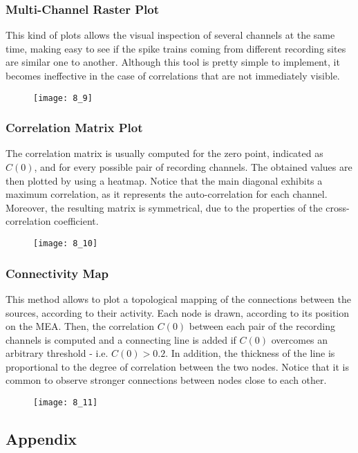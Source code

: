 \subsubsection{Multi-Channel Raster Plot} 
This kind of plots allows the visual inspection
of several channels at the same time, making easy to see if the spike trains coming
from different recording sites are similar one to another. Although this tool is
pretty simple to implement, it becomes ineffective in the case of correlations that are
not immediately visible.
\begin{figure}[H]
    \texttt{[image: 8\_9]}
    \centering
\end{figure}
\subsubsection{Correlation Matrix Plot} 
The correlation matrix is usually computed for
the zero point, indicated as \(C(0)\), and for every possible pair of
recording channels. The obtained values are then plotted by using a heatmap. Notice that the
main diagonal exhibits a maximum correlation, as it represents the auto-correlation
for each channel. Moreover, the resulting matrix is symmetrical, due to the properties of the cross-correlation coefficient.
\begin{figure}[H]
    \texttt{[image: 8\_10]}
    \centering
\end{figure}
\subsubsection{Connectivity Map} 
This method allows to plot a topological mapping of the
connections between the sources, according to their activity. Each node is drawn,
according to its position on the MEA. Then, the correlation \(C(0)\) between each pair
of the recording channels is computed and a connecting line is added if \(C(0)\)
overcomes an arbitrary threshold - i.e. \(C(0)>0.2\). In addition, the thickness of
the line is proportional to the degree of correlation between the two nodes.
Notice that it is common to observe stronger connections between nodes close to
each other.
\begin{figure}[H]
    \texttt{[image: 8\_11]}
    \centering
\end{figure}

\subsection{Appendix}
